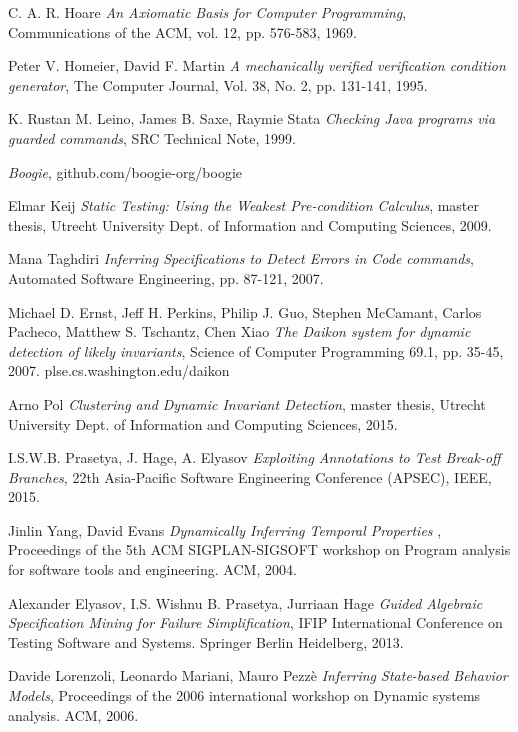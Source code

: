 \documentclass[a4paper, fleqn]{article}
\begin{document}
\begin{thebibliography}{9}

C. A. R. Hoare
  \emph{An Axiomatic Basis for Computer Programming},
Communications of the ACM, vol. 12, pp. 576-583, 1969.

Peter V. Homeier, David F. Martin
  \emph{A mechanically verified verification condition generator}, The Computer Journal, Vol. 38, No. 2, pp. 131-141, 1995.

K. Rustan M. Leino, James B. Saxe, Raymie Stata
  \emph{Checking Java programs via guarded
commands}, SRC Technical Note, 1999.

  \emph{Boogie}, github.com/boogie-org/boogie

Elmar Keij
  \emph{Static Testing: Using the Weakest Pre-condition Calculus}, 
  master thesis, Utrecht University Dept. of Information and Computing Sciences, 2009.
  
Mana Taghdiri
  \emph{Inferring Specifications to Detect Errors in Code
commands}, Automated Software Engineering, pp. 87-121, 2007.

Michael D. Ernst, Jeff H. Perkins, Philip J. Guo, Stephen McCamant, Carlos Pacheco,
Matthew S. Tschantz, Chen Xiao
  \emph{The Daikon system for dynamic detection of likely invariants},
  Science of Computer Programming 69.1, pp. 35-45, 2007.
plse.cs.washington.edu/daikon
  
Arno Pol
  \emph{Clustering and Dynamic Invariant Detection},
master thesis, Utrecht University Dept. of Information and Computing Sciences, 2015.
  
  I.S.W.B. Prasetya,
 J. Hage,
 A. Elyasov
  \emph{Exploiting Annotations to Test Break-off Branches},
  22th Asia-Pacific Software Engineering Conference (APSEC), IEEE, 2015.
  
Jinlin Yang, David Evans 
  \emph{Dynamically Inferring Temporal Properties },
Proceedings  of the 5th ACM SIGPLAN-SIGSOFT workshop on Program analysis for software tools and engineering. ACM, 2004.

Alexander Elyasov, I.S. Wishnu B. Prasetya, Jurriaan Hage
  \emph{Guided Algebraic Specification Mining for Failure Simplification},
IFIP International Conference on Testing Software and Systems. Springer Berlin Heidelberg, 2013.

Davide Lorenzoli, Leonardo Mariani, Mauro Pezz\`e
  \emph{Inferring State-based Behavior Models},
Proceedings of the 2006 international workshop on Dynamic systems analysis. ACM, 2006.


\end{thebibliography}
\end{document}
